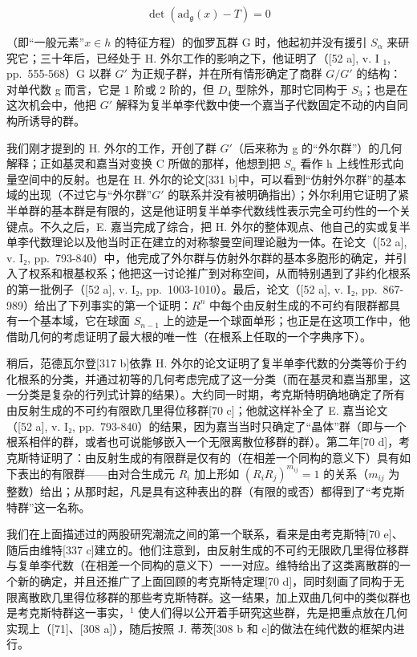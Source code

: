 \[
\det (\mathrm{ad} _ {\mathfrak {g}} (x) - T) = 0
\]

（即“一般元素”\(x \in h\) 的特征方程）的伽罗瓦群 G 时，他起初并没有援引 \(S_{\alpha}\) 来研究它；三十年后，已经处于 H. 外尔工作的影响之下，他证明了（{[}52 a{]}, v. I \(_{1}\), pp.~555-568）G 以群 \(G'\) 为正规子群，并在所有情形确定了商群 \(G/G'\) 的结构：对单代数 g 而言，它是 1 阶或 2 阶的，但 \(D_{4}\) 型除外，那时它同构于 \(S_{3}\)；也是在这次机会中，他把 \(G'\) 解释为复半单李代数中使一个嘉当子代数固定不动的内自同构所诱导的群。

我们刚才提到的 H. 外尔的工作，开创了群 \(G'\)（后来称为 g 的“外尔群”）的几何解释；正如基灵和嘉当对变换 C 所做的那样，他想到把 \(S_{\alpha}\) 看作 h 上线性形式向量空间中的反射。也是在 H. 外尔的论文{[}331 b{]}中，可以看到“仿射外尔群”的基本域的出现（不过它与“外尔群”\(G'\) 的联系并没有被明确指出）；外尔利用它证明了紧半单群的基本群是有限的，这是他证明复半单李代数线性表示完全可约性的一个关键点。不久之后，E. 嘉当完成了综合，把 H. 外尔的整体观点、他自己的实或复半单李代数理论以及他当时正在建立的对称黎曼空间理论融为一体。在论文（{[}52 a{]}, v. I₂, pp.~793-840）中，他完成了外尔群与仿射外尔群的基本多胞形的确定，并引入了权系和根基权系；他把这一讨论推广到对称空间，从而特别遇到了非约化根系的第一批例子（{[}52 a{]}, v. I₂, pp.~1003-1010）。最后，论文（{[}52 a{]}, v. I₂, pp.~867-989）给出了下列事实的第一个证明：\(R^{n}\) 中每个由反射生成的不可约有限群都具有一个基本域，它在球面 \(S_{n-1}\) 上的迹是一个球面单形；也正是在这项工作中，他借助几何的考虑证明了最大根的唯一性（在根系上任取的一个字典序下）。

稍后，范德瓦尔登{[}317 b{]}依靠 H. 外尔的论文证明了复半单李代数的分类等价于约化根系的分类，并通过初等的几何考虑完成了这一分类（而在基灵和嘉当那里，这一分类是复杂的行列式计算的结果）。大约同一时期，考克斯特明确地确定了所有由反射生成的不可约有限欧几里得位移群{[}70 c{]}；他就这样补全了 E. 嘉当论文（{[}52 a{]}, v. I₂, pp.~793-840）的结果，因为嘉当当时只确定了“晶体”群（即与一个根系相伴的群，或者也可说能够嵌入一个无限离散位移群的群）。第二年{[}70 d{]}，考克斯特证明了：由反射生成的有限群是仅有的（在相差一个同构的意义下）具有如下表出的有限群——由对合生成元 \(R_i\) 加上形如 \((R_i R_j)^{m_{ij}} = 1\) 的关系（\(m_{ij}\) 为整数）给出；从那时起，凡是具有这种表出的群（有限的或否）都得到了“考克斯特群”这一名称。

我们在上面描述过的两股研究潮流之间的第一个联系，看来是由考克斯特{[}70 e{]}、随后由维特{[}337 c{]}建立的。他们注意到，由反射生成的不可约无限欧几里得位移群与复单李代数（在相差一个同构的意义下）一一对应。维特给出了这类离散群的一个新的确定，并且还推广了上面回顾的考克斯特定理{[}70 d{]}，同时刻画了同构于无限离散欧几里得位移群的那些考克斯特群。这一结果，加上双曲几何中的类似群也是考克斯特群这一事实，\(^{1}\) 使人们得以公开着手研究这些群，先是把重点放在几何实现上（{[}71{]}、{[}308 a{]}），随后按照 J. 蒂茨{[}308 b 和 c{]}的做法在纯代数的框架内进行。

